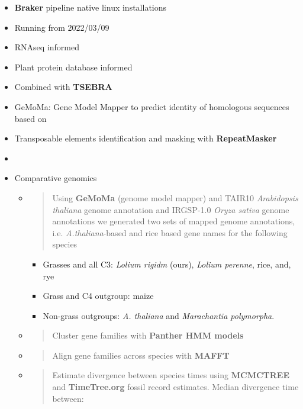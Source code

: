 \begin{itemize}
\item
  \textbf{Braker} pipeline native linux installations
\item
  Running from 2022/03/09
\item
  RNAseq informed
\item
  Plant protein database informed
\item
  Combined with \textbf{TSEBRA}
\item
  GeMoMa: Gene Model Mapper to predict identity of homologous sequences
  based on
\item
  Transposable elements identification and masking with
  \textbf{RepeatMasker}
\item
\item
  Comparative genomics

  \begin{itemize}
  \item
    \begin{quote}
    Using \textbf{GeMoMa} (genome model mapper) and TAIR10
    \emph{Arabidopsis thaliana} genome annotation and IRGSP-1.0
    \emph{Oryza sativa} genome annotations we generated two sets of
    mapped genome annotations, i.e. \emph{A.thaliana}-based and rice
    based gene names for the following species
    \end{quote}

    \begin{itemize}
    \tightlist
    \item
      Grasses and all C3: \emph{Lolium rigidm} (ours), \emph{Lolium
      perenne}, rice, and, rye
    \item
      Grass and C4 outgroup: maize
    \item
      Non-grass outgroups: \emph{A. thaliana }and \emph{Marachantia
      polymorpha}.
    \end{itemize}
  \item
    \begin{quote}
    Cluster gene families with \textbf{Panther HMM models}
    \end{quote}
  \item
    \begin{quote}
    Align gene families across species with \textbf{MAFFT}
    \end{quote}
  \item
    \begin{quote}
    Estimate divergence between species times using \textbf{MCMCTREE}
    and \textbf{TimeTree.org} fossil record estimates. Median divergence
    time between:
    \end{quote}


\end{itemize}
\end{itemize}
